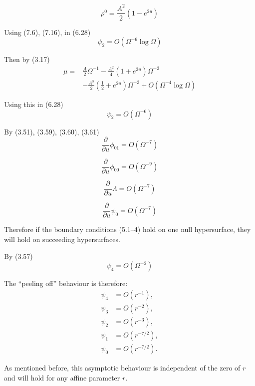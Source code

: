 \begin{equation}
\rho^0
=
\frac{A^2}{2}
\left(
1-e^{2u}
\right)
\tag{7.16}
\end{equation}

Using (7.6), (7.16), in (6.28)
\[
\psi_2
=
O(\Omega^{-6}\log\Omega)
\]

Then by (3.17)
\begin{equation}
\begin{aligned}
\mu
={}&
\frac{A}{2}\Omega^{-1}
-
\frac{A^2}{4}
\left(
1+e^{2u}
\right)\Omega^{-2}
\\
&-
\frac{A^3}{2}
\left(
\frac{1}{2}+e^{2u}
\right)\Omega^{-3}
+
O(\Omega^{-4}\log\Omega)
\end{aligned}
\tag{7.17}
\end{equation}

Using this in (6.28)
\begin{equation}
\psi_2
=
O(\Omega^{-6})
\tag{7.18}
\end{equation}



By (3.51), (3.59), (3.60), (3.61)
\[
\frac{\partial}{\partial u}\phi_{01}
=
O(\Omega^{-7})
\]

\[
\frac{\partial}{\partial u}\phi_{00}
=
O(\Omega^{-9})
\]

\[
\frac{\partial}{\partial u}\Lambda
=
O(\Omega^{-7})
\]

\begin{equation}
\frac{\partial}{\partial u}\psi_0
=
O(\Omega^{-7})
\tag{7.19}
\end{equation}

Therefore if the boundary conditions (5.1--4) hold on
one null hypersurface, they will hold on succeeding hypersurfaces.

By (3.57)
\begin{equation}
\psi_4
=
O(\Omega^{-2})
\tag{7.20}
\end{equation}

The ``peeling off'' behaviour is therefore:
\begin{equation}
\begin{aligned}
\psi_4 &= O(r^{-1}),\\
\psi_3 &= O(r^{-2}),\\
\psi_2 &= O(r^{-3}),\\
\psi_1 &= O(r^{-7/2}),\\
\psi_0 &= O(r^{-7/2}).
\end{aligned}
\tag{7.21}
\end{equation}

As mentioned before, this asymptotic behaviour is independent
of the zero of $r$ and will hold for any affine parameter $r$.

